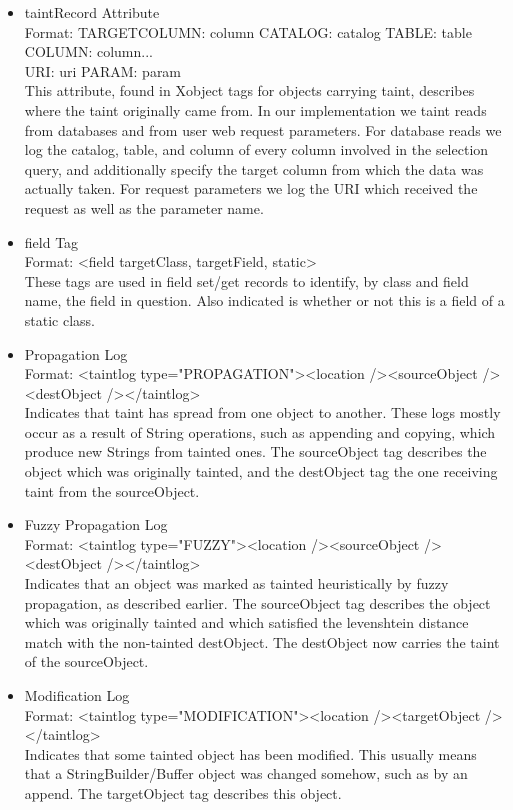 \documentclass[msc,oneside]{ubcthesis}
\begin{document}
\begin{itemize}
\item taintRecord Attribute \\ 
Format: TARGETCOLUMN: column CATALOG: catalog TABLE: table COLUMN: column... \\
URI: uri PARAM: param \\
This attribute, found in Xobject tags for objects carrying taint, describes where the taint originally came from. In our implementation we taint reads from databases and from user web request parameters. For database reads we log the catalog, table, and column of every column involved in the selection query, and additionally specify the target column from which the data was actually taken. For request parameters we log the URI which received the request as well as the parameter name. 

\item field Tag \\ 
Format: <field targetClass, targetField, static> \\
These tags are used in field set/get records to identify, by class and field name, the field in question. Also indicated is whether or not this is a field of a static class.

\item Propagation Log \\ 
Format: <taintlog type="PROPAGATION"><location /><sourceObject /><destObject /></taintlog> \\
Indicates that taint has spread from one object to another. These logs mostly occur as a result of String operations, such as appending and copying, which produce new Strings from tainted ones. The sourceObject tag describes the object which was originally tainted, and the destObject tag the one receiving taint from the sourceObject.

\item Fuzzy Propagation Log \\ 
Format: <taintlog type="FUZZY"><location /><sourceObject /><destObject /></taintlog> \\
Indicates that an object was marked as tainted heuristically by fuzzy propagation, as described earlier. The sourceObject tag describes the object which was originally tainted and which satisfied the levenshtein distance match with the non-tainted destObject. The destObject now carries the taint of the sourceObject.

\item Modification Log \\
Format: <taintlog type="MODIFICATION"><location /><targetObject /></taintlog> \\
Indicates that some tainted object has been modified. This usually means that a StringBuilder/Buffer object was changed somehow, such as by an append. The targetObject tag describes this object.


\end{itemize}
\end{document}
